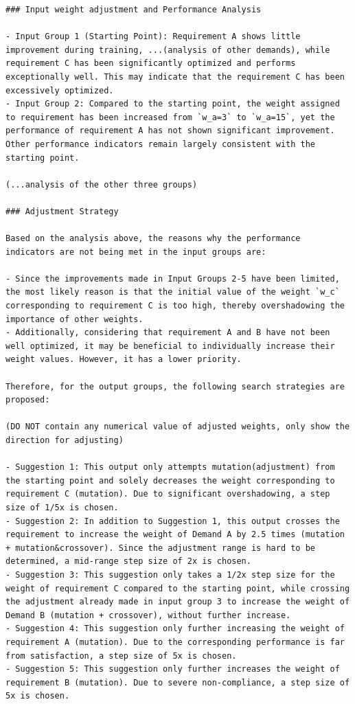 \documentclass{article}
\begin{document}
\begin{verbatim}
### Input weight adjustment and Performance Analysis

- Input Group 1 (Starting Point): Requirement A shows little improvement during training, ...(analysis of other demands), while requirement C has been significantly optimized and performs exceptionally well. This may indicate that the requirement C has been excessively optimized.
- Input Group 2: Compared to the starting point, the weight assigned to requirement has been increased from `w_a=3` to `w_a=15`, yet the performance of requirement A has not shown significant improvement. Other performance indicators remain largely consistent with the starting point.

(...analysis of the other three groups)

### Adjustment Strategy

Based on the analysis above, the reasons why the performance indicators are not being met in the input groups are:

- Since the improvements made in Input Groups 2-5 have been limited, the most likely reason is that the initial value of the weight `w_c` corresponding to requirement C is too high, thereby overshadowing the importance of other weights.
- Additionally, considering that requirement A and B have not been well optimized, it may be beneficial to individually increase their weight values. However, it has a lower priority.

Therefore, for the output groups, the following search strategies are proposed:

(DO NOT contain any numerical value of adjusted weights, only show the direction for adjusting)

- Suggestion 1: This output only attempts mutation(adjustment) from the starting point and solely decreases the weight corresponding to requirement C (mutation). Due to significant overshadowing, a step size of 1/5x is chosen.
- Suggestion 2: In addition to Suggestion 1, this output crosses the requirement to increase the weight of Demand A by 2.5 times (mutation + mutation&crossover). Since the adjustment range is hard to be determined, a mid-range step size of 2x is chosen.
- Suggestion 3: This suggestion only takes a 1/2x step size for the weight of requirement C compared to the starting point, while crossing the adjustment already made in input group 3 to increase the weight of Demand B (mutation + crossover), without further increase.
- Suggestion 4: This suggestion only further increasing the weight of requirement A (mutation). Due to the corresponding performance is far from satisfaction, a step size of 5x is chosen.
- Suggestion 5: This suggestion only further increases the weight of requirement B (mutation). Due to severe non-compliance, a step size of 5x is chosen.


\end{verbatim}
\end{document}
